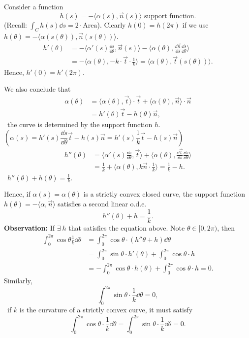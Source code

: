 Consider a function
\[h(s)=-\langle \alpha(s),\vec{n}(s)\rangle\text{ support function}.\]
(Recall: $\int_C h(s)\dd s=2\cdot\mathrm{Area}$). Clearly $h(0)=h(2\pi)$ if
 we use 
 $h(\theta)=-\langle\alpha\left(s(\theta)\right),\vec{n}\left(s(\theta)\right)\rangle$. 
 \begin{align*}
    h'(\theta)&=-\langle \alpha'(s)\frac{\dd s}{\dd\theta},\vec{n}(s)\rangle
    -\langle \alpha(\theta),\frac{\dd \vec{n}}{\dd s}\frac{\dd s}{\dd \theta}\rangle\\
    &=-\langle \alpha(\theta),-k\cdot\vec{t}\cdot\frac{1}{k}\rangle =\langle\alpha(\theta),\vec{t}\left(s(\theta)\right)\rangle
.\end{align*}
Hence, $h'(0)=h'(2\pi)$.

We also conclude that
\begin{align*}
    \alpha(\theta)&=\langle \alpha(\theta), \vec{t}\rangle \cdot \vec{t}
    +\langle \alpha(\theta), \vec{n}\rangle \cdot \vec{n}\\
    &=h'(\theta)\vec{t}-h(\theta)\vec{n}
,\end{align*}
\ie\ the curve is determined by the support function $h$. 
$\left(\alpha(s)=h'(s)\dfrac{\dd s}{\dd \theta}\vec{t}-h(s)\vec{n}=h'(s)\dfrac{1}{k}\vec{t}-h(s)\vec{n}\right)$
\begin{align*}
    h''(\theta)&=\langle \alpha'(s)\frac{\dd s}{\dd \theta},\vec{t}\rangle
    +\langle \alpha(\theta),\frac{\dd \vec{t}}{\dd s}\frac{\dd s}{\dd \theta}
    \rangle\\
    &=\frac{1}{k}+\langle\alpha(\theta),k\vec{n}\cdot \frac{1}{k}\rangle=\frac{1}{k}-h
.\end{align*}
\ie\ $\boxed{h''(\theta)+h(\theta)=\frac{1}{k}}$.

Hence, if $\alpha(s)=\alpha(\theta)$ is a strictly convex closed curve, the
support function $h(\theta)=-\langle\alpha,\vec{n}\rangle$ satisfies a second
linear o.d.e.
\[h''(\theta)+h=\frac{1}{k}.\]
\textbf{Observation:} If $\exists~h$ that satisfies the equation above.
Note $\theta\in [0,2\pi)$, then
\begin{align*}
    \int_0^{2\pi}\cos\theta\frac{1}{k}\dd \theta&=
    \int_0^{2\pi} \cos\theta\cdot\left(h''\theta+h\right)\dd \theta\\
    &=\int_0^{2\pi}\sin\theta\cdot h'(\theta)+\int_0^{2\pi}\cos \theta \cdot h\\
    &=-\int_0^{2\pi}\cos\theta \cdot h(\theta)+\int_0^{2\pi}\cos\theta \cdot h=0
.\end{align*}
Similarly,
\[\int_0^{2\pi}\sin\theta\cdot\frac{1}{k}\dd \theta=0,\]
\ie\ if $k$ is the curvature of a strictly convex curve, it must satisfy
\[
    \int_0^{2\pi}\cos\theta\cdot\frac{1}{k}\dd \theta
    =\int_0^{2\pi}\sin\theta\cdot\frac{1}{k}\dd \theta
    =0
.\]

